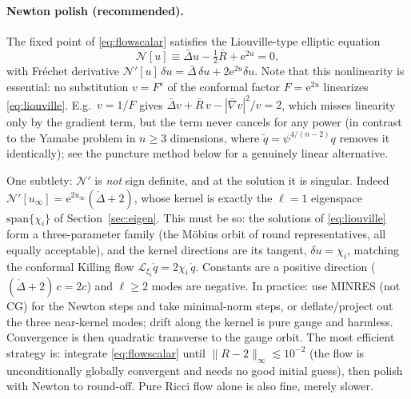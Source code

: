 \documentclass[11pt]{article}
\newcommand{\ee}{\mathrm{e}}
\newcommand{\Lie}{\mathcal{L}}
\newcommand{\qo}{\mathring{q}}          %
\newcommand{\Lapo}{\mathring{\Delta}}   %
\begin{document}
\paragraph{Newton polish (recommended).}
The fixed point of \eqref{eq:flowscalar} satisfies the Liouville-type
elliptic equation
\begin{equation}
  \mathcal{N}[u] \equiv \bar\Delta u - \tfrac12\bar R + \ee^{2u} = 0 ,
  \label{eq:liouville}
\end{equation}
with Fr\'echet derivative
$\mathcal{N}'[u]\,\delta u = \bar\Delta\,\delta u + 2\ee^{2u}\delta u$.
Note that this nonlinearity is essential: no substitution $v = F^s$ of the
conformal factor $F = \ee^{2u}$ linearizes \eqref{eq:liouville}.  E.g.\
$v = 1/F$ gives $\bar\Delta v + \bar R\,v - |\bar\nabla v|^2/v = 2$, which
misses linearity only by the gradient term, but the term never cancels for
any power (in contrast to the Yamabe problem in $n\ge3$ dimensions, where
$\tilde q = \psi^{4/(n-2)}q$ removes it identically); see
the puncture method below for a genuinely linear alternative.

One subtlety: $\mathcal{N}'$ is \emph{not} sign definite, and at the
solution it is singular.  Indeed
$\mathcal{N}'[u_\infty] = \ee^{2u_\infty}(\Lapo + 2)$, whose kernel is
exactly the $\ell=1$ eigenspace $\mathrm{span}\{\chi_i\}$ of
Section~\ref{sec:eigen}.  This must be so: the solutions of
\eqref{eq:liouville} form a three-parameter family (the M\"obius orbit of
round representatives, all equally acceptable), and the kernel directions
are its tangent, $\delta u = \chi_i$, matching the conformal Killing flow
$\Lie_{\xi_i}\qo = 2\chi_i\,\qo$.  Constants are a positive direction
($(\Lapo+2)\,c = 2c$) and $\ell\ge2$ modes are negative.  In practice:
use MINRES (not CG) for the Newton steps and take minimal-norm steps, or
deflate/project out the three near-kernel modes; drift along the kernel is
pure gauge and harmless.  Convergence is then quadratic transverse to the
gauge orbit.  The most efficient strategy is: integrate
\eqref{eq:flowscalar} until $\lVert R-2\rVert_\infty \lesssim 10^{-2}$ (the
flow is unconditionally globally convergent and needs no good initial guess),
then polish with Newton to round-off.  Pure Ricci flow alone is also fine,
merely slower.
\end{document}
